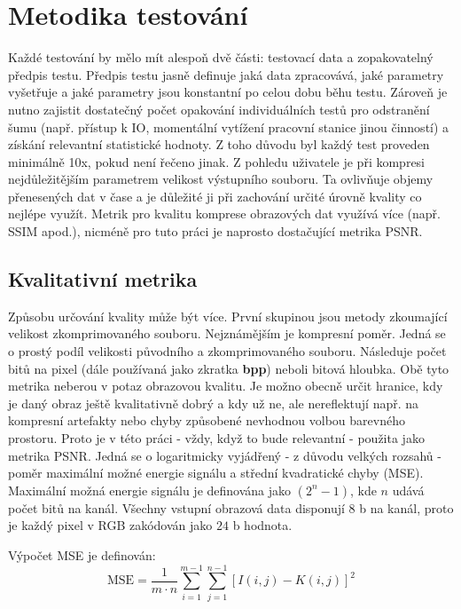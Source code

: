 \chapter{Metodika testování}
\label{mereni}
Každé testování by mělo mít alespoň dvě části: testovací data a zopakovatelný předpis testu. Předpis testu jasně definuje jaká data zpracovává, jaké parametry vyšetřuje a jaké parametry jsou konstantní po celou dobu běhu testu. Zároveň je nutno zajistit dostatečný počet opakování individuálních testů pro odstranění šumu (např. přístup k IO, momentální vytížení pracovní stanice jinou činností) a získání relevantní statistické hodnoty. Z toho důvodu byl každý test proveden minimálně 10x, pokud není řečeno jinak. Z pohledu uživatele je při kompresi nejdůležitějším parametrem velikost výstupního souboru. Ta ovlivňuje objemy přenesených dat v čase a je důležité ji při zachování určité úrovně kvality co nejlépe využít. Metrik pro kvalitu komprese obrazových dat využívá více (např. SSIM apod.), nicméně pro tuto práci je naprosto dostačující metrika PSNR.

\section{Kvalitativní metrika}
Způsobu určování kvality může být více. První skupinou jsou metody zkoumající velikost zkomprimovaného souboru. Nejznámějším je kompresní poměr. Jedná se o prostý podíl velikosti původního a zkomprimovaného souboru. Následuje počet bitů na pixel (dále používaná jako zkratka \textbf{bpp}) neboli bitová hloubka. Obě tyto metrika neberou v potaz obrazovou kvalitu. Je možno obecně určit hranice, kdy je daný obraz ještě kvalitativně dobrý a kdy už ne, ale nereflektují např. na kompresní artefakty nebo chyby způsobené nevhodnou volbou barevného prostoru. Proto je v této práci - vždy, když to bude relevantní - použita jako metrika PSNR. Jedná se o logaritmicky vyjádřený - z důvodu velkých rozsahů - poměr maximální možné energie signálu a střední kvadratické chyby (MSE). Maximální možná energie signálu je definována jako $(2^n-1)$, kde $n$ udává počet bitů na kanál. Všechny vstupní obrazová data disponují $8$ b na kanál, proto je každý pixel v RGB zakódován jako $24$ b hodnota.

\noindent Výpočet MSE je definován:
\begin{equation}
  \text{MSE} = \frac{1}{m\cdot n} \sum_{i=1}^{m-1}\sum_{j=1}^{n-1} [I(i,j) - K(i,j)]^2
  \label{eq:mse}
\end{equation}


